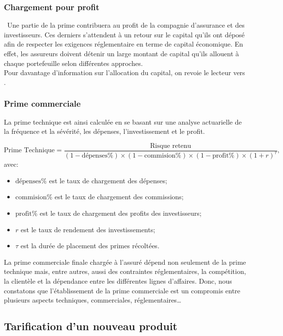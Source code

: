 \documentclass[11pt]{article}
\begin{document}
\subsubsection{Chargement pour profit}\
Une partie de la prime contribuera au profit de la compagnie d'assurance et des investisseurs. Ces derniers s'attendent à un retour sur le capital qu'ils ont déposé afin de respecter les exigences réglementaire en terme de capital économique. En effet, les assureurs doivent détenir un large montant de capital qu'ils allouent à chaque portefeuille selon différentes approches.\\
Pour davantage d'information sur l'allocation du capital, on revoie le lecteur vers \cite{parodi2014pricing}.
\subsubsection{Prime commerciale}
La prime technique est ainsi calculée en se basant sur une analyse actuarielle de la fréquence et la sévérité, les dépenses, l’investissement et le profit.

\begin{equation}
\text{Prime Technique} = \frac{\text{Risque retenu}}{(1-\text{dépenses}\%) \times (1-\text{commision}\%)\times (1-\text{profit}\%) \times (1+r)^{\tau}}, \nonumber
\end{equation}
avec:
\begin{itemize}
\item $\text{dépenses}\%$ est le taux de chargement des dépenses;
\item $\text{commision}\%$ est le taux de chargement des commissions;
\item $\text{profit}\%$ est le taux de chargement des profits des investisseurs;
\item $r$ est le taux de rendement des investissements;
\item $\tau$ est la durée de placement des primes récoltées.\\
\end{itemize}
La prime commerciale finale chargée à l’assuré dépend non seulement de la prime technique mais, entre autres, aussi des contraintes réglementaires, la compétition, la clientèle et la dépendance entre les différentes lignes d’affaires. Donc, nous constatons que l’établissement de la prime commerciale est un compromis entre plusieurs aspects techniques, commerciales, réglementaires…

\subsection{Tarification d'un nouveau produit}
\end{document}
